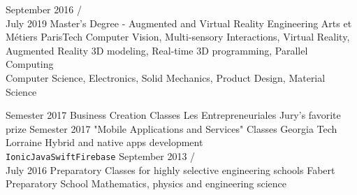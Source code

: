 \documentclass[9pt]{developercv} %
\begin{document}
 

 

\begin{entrylist}
	\entry
		{September 2016  / \\ July 2019}
		{Master's Degree - Augmented and Virtual Reality Engineering}
		{ Arts et Métiers ParisTech}
		{Computer Vision, Multi-sensory Interactions, Virtual Reality, Augmented Reality
		3D modeling, Real-time 3D programming, Parallel Computing\\
		Computer Science, Electronics, Solid Mechanics, Product Design, Material Science}

	\entry
		{ Semester 2017}
		{Business Creation Classes}
		{Les Entrepreneuriales}
		{Jury's favorite prize}
	\entry
		{  Semester 2017}
		{"Mobile Applications and Services" Classes}
		{Georgia Tech Lorraine}
		{Hybrid and native apps development
		\\ \texttt{Ionic}\slashsep\texttt{Java}\slashsep\texttt{Swift}\slashsep\texttt{Firebase}}
	\entry
		{September 2013  / \\ July 2016}
		{Preparatory Classes for highly selective engineering schools}
		{Fabert Preparatory School}
		{ Mathematics, physics and engineering science}

		
\end{entrylist}




\vspace{0,5cm}


\begin{minipage}[t]{0.4\textwidth} %
	\vspace{-\baselineskip} %
	\begin{barchart}{5.5}

	\end{barchart}
\end{minipage}
\hfill %
\begin{minipage}[t]{0.5\textwidth} %
	\vspace{-\baselineskip} %
	\begin{barchart}{5.5}
	\end{barchart}
\end{minipage}
\end{document}
